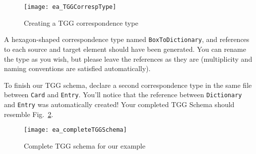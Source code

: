 \begin{figure}[htbp]
\begin{center}
  \texttt{[image: ea\_TGGCorrespType]}
  \caption{Creating a TGG correspondence type} 
  \label{fig:create_correspondence}
\end{center}
\end{figure}

A hexagon-shaped correspondence type named \texttt{BoxToDiction\-ary}, and references to each source and target element should have been generated.
You can rename the type as you wish, but please leave the references as they are (multiplicity and naming conventions are satisfied automatically).

To finish our TGG schema, declare a second correspondence type in the same file between \texttt{Card} and \texttt{Entry}. You'll notice that the
reference between \texttt{Dictionary} and \texttt{Entry} was automatically created! Your completed TGG Schema should resemble
Fig.~\ref{fig:complete_tgg_schema}.

\begin{figure}[htbp]
\begin{center}
  \texttt{[image: ea\_completeTGGSchema]}
  \caption{Complete TGG schema for our example}
  \label{fig:complete_tgg_schema}
\end{center}
\end{figure}

